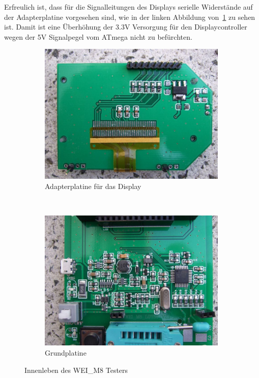 Erfreulich ist, dass für die Signalleitungen des Displays serielle Widerstände
auf der Adapterplatine vorgesehen sind, wie in der linken Abbildung von~\ref{fig:WeiM8int}
zu sehen ist. Damit ist eine Überhöhung der 3.3V Versorgung für den Displaycontroller
wegen der 5V Signalpegel vom ATmega nicht zu befürchten.

\begin{figure}[H]
  \begin{subfigure}[b]{9cm}
    \centering
    \includegraphics[width=9cm]{../PNG/WEI_M8_D.JPG}
    \caption{Adapterplatine für das Display}
  \end{subfigure}
  ~
  \begin{subfigure}[b]{9cm}
    \centering
    \includegraphics[width=9cm]{../PNG/WEI_M8_L.JPG}
    \caption{Grundplatine}
  \end{subfigure}
  \caption{Innenleben des WEI\_M8 Testers}
  \label{fig:WeiM8int}
\end{figure}


